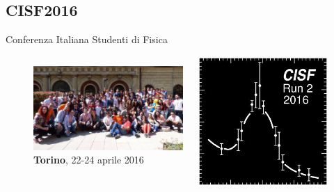 \documentclass{Bredelebeamer}
\begin{document}
\subsection{CISF2016}
\begin{frame}{Conferenza Italiana Studenti di Fisica}
\begin{figure}
\begin{columns}
\begin{column}{0.5\textwidth}
\includegraphics[width=5.7cm]{images/CISF1.jpg}
\\
\centering \textbf{Torino}, 22-24 aprile 2016
\end{column}
\begin{column}{0.5\textwidth}
\includegraphics[width=5cm]{images/CISF2.jpg}
\end{column}
\end{columns}
\end{figure}
\end{frame}
\end{document}
